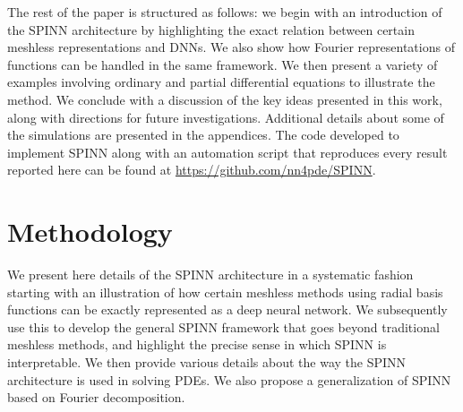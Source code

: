 \documentclass[12pt]{article}
\begin{document}
The rest of the paper is structured as follows: we begin with an introduction of the SPINN architecture by highlighting the exact relation between certain meshless representations and DNNs. We also show how Fourier representations of functions can be handled in the same framework. We then present a variety of examples involving ordinary and partial differential equations to illustrate the method. We conclude with a discussion of the key ideas presented in this work, along with directions for future investigations. Additional details about some of the simulations are presented in the appendices. The code developed to implement SPINN along with an automation script that reproduces every result reported here can be found at \url{https://github.com/nn4pde/SPINN}.

\section{Methodology}
We present here details of the SPINN architecture in a systematic fashion starting with an illustration of how certain meshless methods using radial basis functions can be exactly represented as a deep neural network. We subsequently use this to develop the general SPINN framework that goes beyond traditional meshless methods, and highlight the precise sense in which SPINN is interpretable. We then provide various details about the way the SPINN architecture is used in solving PDEs. We also propose a generalization of SPINN based on Fourier decomposition.
\end{document}
